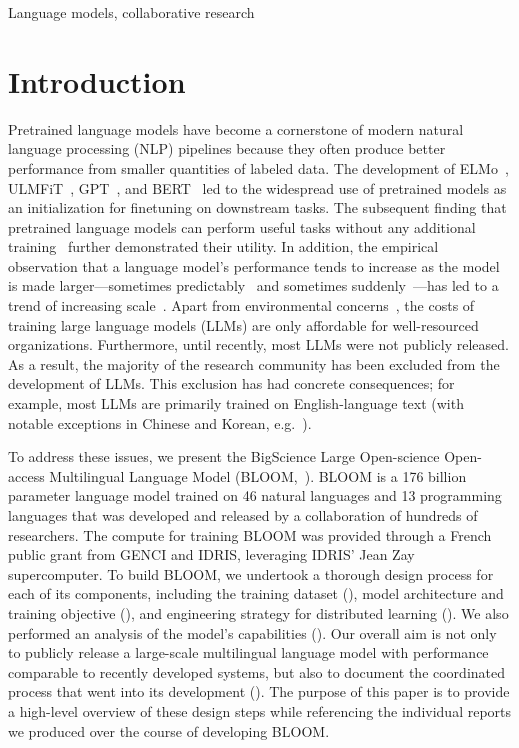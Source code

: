 \documentclass[twoside,11pt]{article}
\begin{document}
\begin{keywords}
Language models, collaborative research
\end{keywords}

\section{Introduction}

Pretrained language models have become a cornerstone of modern natural language processing (NLP) pipelines because they often produce better performance from smaller quantities of labeled data.
The development of ELMo~\citep{peters2018deep}, ULMFiT~\citep{howard2018universal}, GPT~\citep{radford2018improving}, and BERT~\citep{devlin2019bert} led to the widespread use of pretrained models as an initialization for finetuning on downstream tasks.
The subsequent finding that pretrained language models can perform useful tasks without any additional training~\citep{radford2019language,brown2020language} further demonstrated their utility.
In addition, the empirical observation that a language model's performance tends to increase as the model is made larger---sometimes predictably~\citep{hestness2017deep,kaplan2020scaling,hoffmann2022training} and sometimes suddenly~\citep{wei2022emergent}---has led to a trend of increasing scale~\citep{zeng2021pangu, rae2021scaling, smith2022using, chowdhery2022palm}. 
Apart from environmental concerns~\citep{strubell2019energy,lacoste2019quantifying,schwartz2020green}, the costs of training large language models (LLMs) are only affordable for well-resourced organizations.
Furthermore, until recently, most LLMs were not publicly released.
As a result, the majority of the research community has been excluded from the development of LLMs.
This exclusion has had concrete consequences; for example, most LLMs are primarily trained on English-language text (with notable exceptions in Chinese and Korean, e.g.~\citealp{wang2021ernie,zeng2021pangu,kim2021changes}).

To address these issues, we present the BigScience Large Open-science Open-access Multilingual Language Model (BLOOM,~\citealp{bloom_model}).
BLOOM is a 176 billion parameter language model trained on 46 natural languages and 13 programming languages that was developed and released by a collaboration of hundreds of researchers.
The compute for training BLOOM was provided through a French public grant from GENCI and IDRIS, leveraging IDRIS' Jean Zay supercomputer.
To build BLOOM, we undertook a thorough design process for each of its components, including the training dataset (), model architecture and training objective (), and engineering strategy for distributed learning ().
We also performed an analysis of the model's capabilities ().
Our overall aim is not only to publicly release a large-scale multilingual language model with performance comparable to recently developed systems, but also to document the coordinated process that went into its development ().
The purpose of this paper is to provide a high-level overview of these design steps while referencing the individual reports we produced over the course of developing BLOOM.
\end{document}
